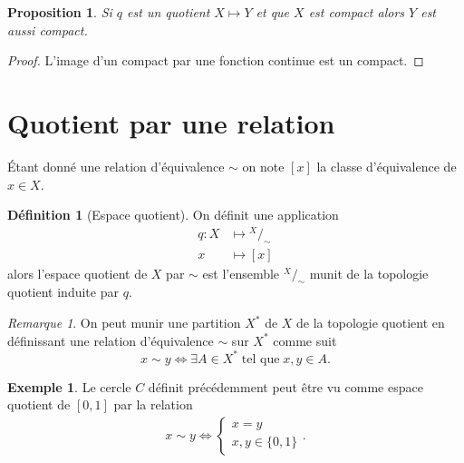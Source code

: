 \documentclass[12pt]{book}
\newtheorem{prop}[lemma]{Proposition}
\theoremstyle{definition}
\newtheorem{definition}[lemma]{Définition}
\newtheorem{example}[lemma]{Exemple}
\theoremstyle{remark}
\newtheorem*{remark}{Remarque}
\newcommand*\quot[2]{{^{\textstyle #1}\big/_{\textstyle #2}}}
\begin{document}
	\begin{prop}
		Si $q$ est un quotient $X \longmapsto Y$ et que $X$ est compact alors $Y$ est aussi compact.
	\end{prop}
	\begin{proof}
		L'image d'un compact par une fonction continue est un compact.
	\end{proof}

	\section{Quotient par une relation}
	Étant donné une relation d'équivalence $\sim$ on note $[x]$ la classe d'équivalence de  $x \in X$.
	\begin{definition}[Espace quotient]
		On définit une application
		\begin{align*}
			q : X &\longmapsto \quot{X}{\sim} \\
			x &\longmapsto [x]
		\end{align*}
		alors l'espace quotient de $X$ par $\sim$ est l'ensemble $\quot{X}{\sim}$ munit de la topologie quotient induite par $q$.
	\end{definition}
	\begin{remark}
		On peut munir une partition $X^*$ de $X$ de la topologie quotient en définissant une relation d'équivalence $\sim$ sur  $X^*$ comme suit \[
			x \sim y \iff \exists A \in X^* \; \text{tel que} \; x,y \in A
		.\] 
	\end{remark}
	\begin{example}
		Le cercle $C$ définit précédemment peut être vu comme espace quotient de $[0,1]$ par la relation 
		 \begin{align*}
			x \sim y \iff \begin{cases}
				x = y \\
				x,y \in \{0,1\}
			\end{cases}
		.\end{align*}
	\end{example}
\end{document}
